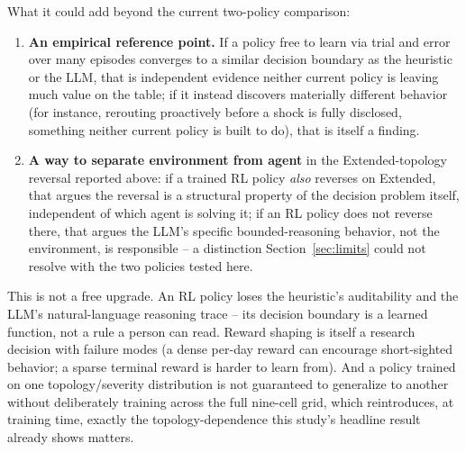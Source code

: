 \documentclass[10pt,twocolumn]{article}
\begin{document}
What it could add beyond the current two-policy comparison:

\begin{enumerate}[leftmargin=1.6em,itemsep=2pt,label=(\roman*)]
\item \textbf{An empirical reference point.} If a policy free to learn via trial and error over many episodes converges to a similar decision boundary as the heuristic or the LLM, that is independent evidence neither current policy is leaving much value on the table; if it instead discovers materially different behavior (for instance, rerouting proactively before a shock is fully disclosed, something neither current policy is built to do), that is itself a finding.
\item \textbf{A way to separate environment from agent} in the Extended-topology reversal reported above: if a trained RL policy \emph{also} reverses on Extended, that argues the reversal is a structural property of the decision problem itself, independent of which agent is solving it; if an RL policy does not reverse there, that argues the LLM's specific bounded-reasoning behavior, not the environment, is responsible -- a distinction Section~\ref{sec:limits} could not resolve with the two policies tested here.
\end{enumerate}

This is not a free upgrade. An RL policy loses the heuristic's auditability and the LLM's natural-language reasoning trace -- its decision boundary is a learned function, not a rule a person can read. Reward shaping is itself a research decision with failure modes (a dense per-day reward can encourage short-sighted behavior; a sparse terminal reward is harder to learn from). And a policy trained on one topology/severity distribution is not guaranteed to generalize to another without deliberately training across the full nine-cell grid, which reintroduces, at training time, exactly the topology-dependence this study's headline result already shows matters.
\end{document}
